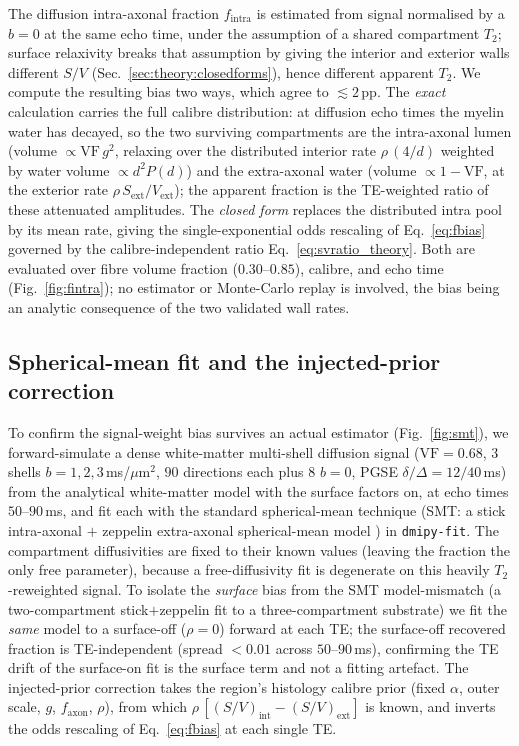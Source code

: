 The diffusion intra-axonal fraction $f_{\mathrm{intra}}$ is estimated from signal
normalised by a $b{=}0$ at the same echo time, under the assumption of a shared
compartment $T_2$; surface relaxivity breaks that assumption by giving the interior and
exterior walls different $S/V$ (Sec.~\ref{sec:theory:closedforms}), hence different
apparent $T_2$. We compute the resulting bias two ways, which agree to
${\lesssim}2$\,pp. The \emph{exact} calculation carries the full calibre distribution: at
diffusion echo times the myelin water has decayed, so the two surviving compartments are
the intra-axonal lumen (volume $\propto\mathrm{VF}\,g^2$, relaxing over the distributed
interior rate $\rho\,(4/d)$ weighted by water volume $\propto d^2 P(d)$) and the
extra-axonal water (volume $\propto 1-\mathrm{VF}$, at the exterior rate
$\rho\,S_{\mathrm{ext}}/V_{\mathrm{ext}}$); the apparent fraction is the TE-weighted ratio
of these attenuated amplitudes. The \emph{closed form} replaces the distributed intra pool
by its mean rate, giving the single-exponential odds rescaling of Eq.~\eqref{eq:fbias}
governed by the calibre-independent ratio Eq.~\eqref{eq:svratio_theory}. Both are evaluated
over fibre volume fraction ($0.30$--$0.85$), calibre, and echo time
(Fig.~\ref{fig:fintra}); no estimator or Monte-Carlo replay is involved, the bias being an
analytic consequence of the two validated wall rates.

\subsection{Spherical-mean fit and the injected-prior correction}
\label{sec:methods:smt}

To confirm the signal-weight bias survives an actual estimator (Fig.~\ref{fig:smt}), we
forward-simulate a dense white-matter multi-shell diffusion signal ($\mathrm{VF}=0.68$,
$3$ shells $b=1,2,3\,$ms/$\mu$m$^2$, $90$ directions each plus $8$ $b{=}0$, PGSE
$\delta/\Delta=12/40\,$ms) from the analytical white-matter model with the surface factors on,
at echo times $50$--$90\,$ms, and fit each with the standard spherical-mean technique (SMT: a
stick intra-axonal $+$ zeppelin extra-axonal spherical-mean model \citep{Kaden2016}) in
\texttt{dmipy-fit}. The compartment diffusivities are fixed to their known values (leaving the
fraction the only free parameter), because a free-diffusivity fit is degenerate on this heavily
$T_2$-reweighted signal. To isolate the \emph{surface} bias from the SMT model-mismatch
(a two-compartment stick$+$zeppelin fit to a three-compartment substrate) we fit the
\emph{same} model to a surface-off ($\rho=0$) forward at each TE; the surface-off recovered
fraction is TE-independent (spread ${<}0.01$ across $50$--$90\,$ms), confirming the TE drift of
the surface-on fit is the surface term and not a fitting artefact. The injected-prior
correction takes the region's histology calibre prior (fixed $\alpha$, outer scale, $g$,
$f_{\mathrm{axon}}$, $\rho$), from which $\rho\,[(S/V)_{\mathrm{int}}-(S/V)_{\mathrm{ext}}]$ is
known, and inverts the odds rescaling of Eq.~\eqref{eq:fbias} at each single TE.

